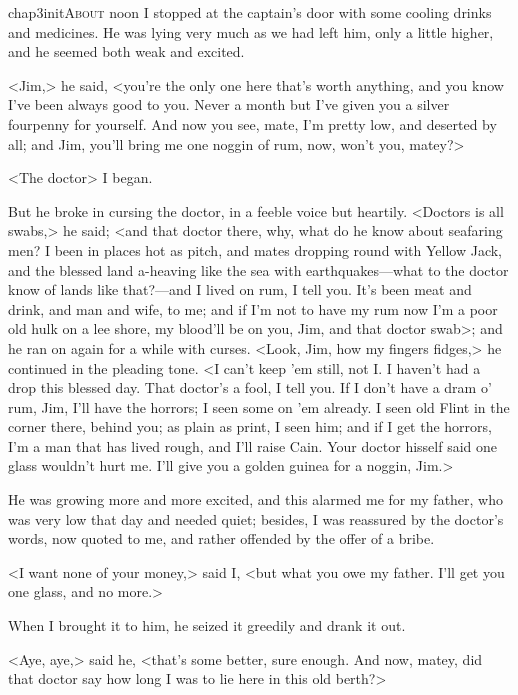 
\lettrine{chap3initA}{bout} noon I stopped at the captain's door with some cooling drinks and medicines. He was lying very much as we had left him, only a little higher, and he seemed both weak and excited.

\zz
<Jim,> he said, <you're the only one here that's worth anything, and you know I've been always good to you. Never a month but I've given you a silver fourpenny for yourself. And now you see, mate, I'm pretty low, and deserted by all; and Jim, you'll bring me one noggin of rum, now, won't you, matey?>

<The doctor\longdash> I began.

But he broke in cursing the doctor, in a feeble voice but heartily. <Doctors is all swabs,> he said; <and that doctor there, why, what do he know about seafaring men? I been in places hot as pitch, and mates dropping round with Yellow Jack, and the blessed land a-heaving like the sea with earthquakes—what to the doctor know of lands like that?—and I lived on rum, I tell you. It's been meat and drink, and man and wife, to me; and if I'm not to have my rum now I'm a poor old hulk on a lee shore, my blood'll be on you, Jim, and that doctor swab>; and he ran on again for a while with curses. <Look, Jim, how my fingers fidges,> he continued in the pleading tone. <I can't keep 'em still, not I\@. I haven't had a drop this blessed day. That doctor's a fool, I tell you. If I don't have a dram o' rum, Jim, I'll have the horrors; I seen some on 'em already. I seen old Flint in the corner there, behind you; as plain as print, I seen him; and if I get the horrors, I'm a man that has lived rough, and I'll raise Cain. Your doctor hisself said one glass wouldn't hurt me. I'll give you a golden guinea for a noggin, Jim.>

He was growing more and more excited, and this alarmed me for my father, who was very low that day and needed quiet; besides, I was reassured by the doctor's words, now quoted to me, and rather offended by the offer of a bribe.

<I want none of your money,> said I, <but what you owe my father. I'll get you one glass, and no more.>

When I brought it to him, he seized it greedily and drank it out.

<Aye, aye,> said he, <that's some better, sure enough. And now, matey, did that doctor say how long I was to lie here in this old berth?>

